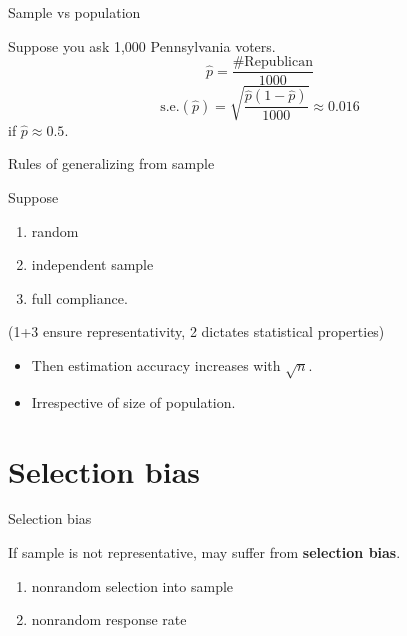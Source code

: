 \documentclass[ignorenonframetext,aspectratio=54,]{beamer}
\providecommand{\tightlist}{%
  \setlength{\itemsep}{0pt}\setlength{\parskip}{0pt}}
\begin{document}
\begin{frame}{Sample vs population}
\protect\hypertarget{sample-vs-population}{}

Suppose you ask 1,000 Pennsylvania voters. \[
\hat p = \frac {\# \text{Republican}}{1000}
\] \[
\text{s.e.}(\hat p) = \sqrt{\frac {\hat p (1-\hat p)}{1000}} \approx 0.016
\] if \(\hat p\approx 0.5\).

\end{frame}

\begin{frame}{Rules of generalizing from sample}
\protect\hypertarget{rules-of-generalizing-from-sample}{}

Suppose

\begin{enumerate}
\tightlist
\item
  random
\item
  independent sample
\item
  full compliance.
\end{enumerate}

(1+3 ensure representativity, 2 dictates statistical properties)

\begin{itemize}
\tightlist
\item
  Then estimation accuracy increases with \(\sqrt{n}\).
\item
  Irrespective of size of population.
\end{itemize}

\end{frame}

\hypertarget{selection-bias}{%
\section{Selection bias}\label{selection-bias}}

\begin{frame}{Selection bias}
\protect\hypertarget{selection-bias-1}{}

If sample is not representative, may suffer from \textbf{selection
bias}.

\begin{enumerate}
\tightlist
\item
  nonrandom selection into sample
\item
  nonrandom response rate
\end{enumerate}

\end{frame}
\end{document}
